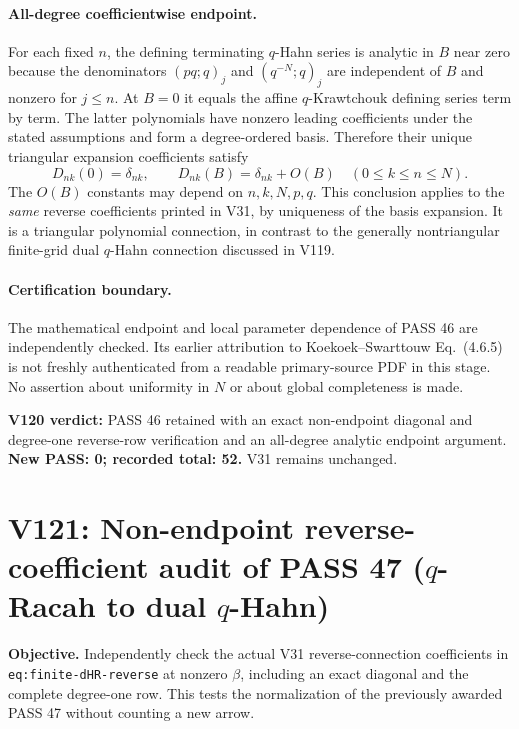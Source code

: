 \documentclass[11pt]{article}
\begin{document}
\paragraph{All-degree coefficientwise endpoint.} For each fixed $n$, the defining terminating $q$-Hahn series is analytic in $B$ near zero because the denominators $(pq;q)_j$ and $(q^{-N};q)_j$ are independent of $B$ and nonzero for $j\le n$. At $B=0$ it equals the affine $q$-Krawtchouk defining series term by term. The latter polynomials have nonzero leading coefficients under the stated assumptions and form a degree-ordered basis. Therefore their unique triangular expansion coefficients satisfy
\begin{equation}\label{eq:v120-endpoint}
\boxed{D_{nk}(0)=\delta_{nk},\qquad D_{nk}(B)=\delta_{nk}+O(B)\quad(0\le k\le n\le N).}
\end{equation}
The $O(B)$ constants may depend on $n,k,N,p,q$. This conclusion applies to the \emph{same} reverse coefficients printed in V31, by uniqueness of the basis expansion. It is a triangular polynomial connection, in contrast to the generally nontriangular finite-grid dual $q$-Hahn connection discussed in V119.

\paragraph{Certification boundary.} The mathematical endpoint and local parameter dependence of PASS 46 are independently checked. Its earlier attribution to Koekoek--Swarttouw Eq.~(4.6.5) is not freshly authenticated from a readable primary-source PDF in this stage. No assertion about uniformity in $N$ or about global completeness is made.

\noindent\textbf{V120 verdict:} PASS 46 retained with an exact non-endpoint diagonal and degree-one reverse-row verification and an all-degree analytic endpoint argument. \textbf{New PASS: 0; recorded total: 52.} V31 remains unchanged.



\clearpage
\section{V121: Non-endpoint reverse-coefficient audit of PASS 47 ($q$-Racah to dual $q$-Hahn)}
\noindent\textbf{Objective.} Independently check the actual V31 reverse-connection coefficients in \texttt{eq:finite-dHR-reverse} at nonzero $\beta$, including an exact diagonal and the complete degree-one row. This tests the normalization of the previously awarded PASS 47 without counting a new arrow.
\end{document}
